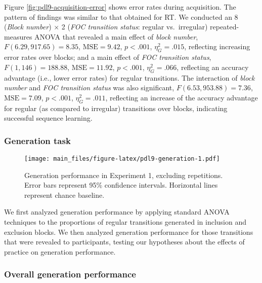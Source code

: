\documentclass[jou]{apa6}
\theoremstyle{definition}
\theoremstyle{definition}
\theoremstyle{definition}
\theoremstyle{remark}
\begin{document}
Figure \ref{fig:pdl9-acquisition-error} shows error rates during
acquisition. The pattern of findings was similar to that obtained for
RT. We conducted an 8 (\emph{Block number}) \(\times\) 2 (\emph{FOC
transition status}: regular vs.~irregular) repeated-measures ANOVA that
revealed a main effect of \emph{block number},
\(F(6.29, 917.65) = 8.35\), \(\mathrm{MSE} = 9.42\), \(p < .001\),
\(\eta^2_G = .015\), reflecting increasing error rates over blocks; and
a main effect of \emph{FOC transition status}, \(F(1, 146) = 188.88\),
\(\mathrm{MSE} = 11.92\), \(p < .001\), \(\eta^2_G = .066\), reflecting
an accuracy advantage (i.e., lower error rates) for regular transitions.
The interaction of \emph{block number} and \emph{FOC transition status}
was also significant, \(F(6.53, 953.88) = 7.36\),
\(\mathrm{MSE} = 7.09\), \(p < .001\), \(\eta^2_G = .011\), reflecting
an increase of the accuracy advantage for regular (as compared to
irregular) transitions over blocks, indicating successful sequence
learning.

\subsubsection{Generation task}\label{generation-task}

\begin{figure}[htbp]
\centering
\texttt{[image: main\_files/figure-latex/pdl9-generation-1.pdf]}
\caption{\label{fig:pdl9-generation}Generation performance in Experiment 1,
excluding repetitions. Error bars represent 95\% confidence intervals.
Horizontal lines represent chance baseline.}
\end{figure}

We first analyzed generation performance by applying standard ANOVA
techniques to the proportions of regular transitions generated in
inclusion and exclusion blocks. We then analyzed generation performance
for those transitions that were revealed to participants, testing our
hypotheses about the effects of practice on generation performance.

\subsubsection{Overall generation
performance}\label{overall-generation-performance}
\end{document}
